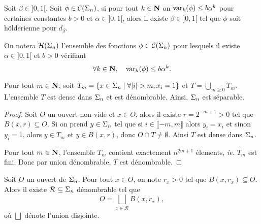   \begin{proposition}
    \label{prop:equiv_holder}
    Soit $\beta \in ]0, 1[$.
    Soit $\phi \in \mathcal{C} (\Sigma_{n})$, si pour tout $k \in \mathbf N$ on $\operatorname{var}_k(\phi) \leq b\alpha^k$ pour certaines constantes $b > 0$ et $\alpha \in ]0, 1[$,
    alors il existe $\beta \in ]0, 1[$ tel que $\phi$ soit hölderienne pour $d_{\beta}$.
  \end{proposition}

  \begin{definition}
    \label{def:holder_fn_set}
    On notera $\mathcal{H} (\Sigma_{n})$ l'ensemble des fonctions $\phi \in \mathcal{C} (\Sigma_{n})$ pour lesquels il existe $\alpha \in ]0, 1[$ et $b > 0$ vérifiant
    $$\forall k \in \mathbf N, \hspace{1em} \operatorname{var}_k(\phi) \leq b\alpha^k.$$
  \end{definition}


  \begin{proposition}
    \label{prop:separable}
    Pour tout $m \in \mathbf N$, soit $T_m = \left\{x \in \s_n \mid \forall|i|>m, x_i=1\right\}$ et $T = \bigcup_{m\geq 0}{T_m}$.
    L'ensemble $T$ est dense dans $\Sigma_n$ et est dénombrable. Ainsi, $\Sigma_n$ est séparable.
  \end{proposition}

  \begin{proof}
    Soit $O$ un ouvert non vide et $x \in O$, alors il existe $r = 2^{-m+1} > 0$ tel que $B(x, r) \subseteq O$.
    Si on prend $y \in \Sigma_n$ tel que si $i \in \llbracket -m, m \rrbracket$ alors $y_i = x_i$ et sinon $y_i = 1$,
    alors $y \in T_m$ et $y \in B(x, r)$, donc $O \cap T \not= \emptyset$. Ainsi $T$ est dense dans $\Sigma_n$.

    Pour tout $m \in \mathbf N$, l'ensemble $T_m$ contient exactement $n^{2m+1}$ élements, \textit{ie.} $T_m$ est fini.
    Donc par union dénombrable, $T$ est dénombrable.
  \end{proof}

  \begin{proposition}
    \label{prop:boules}
    Soit $O$ un ouvert de $\Sigma_n$. Pour tout $x \in O$, on note $r_x > 0$ tel que $B(x, r_x) \subseteq O$.
    Alors il existe $\mathcal R \subseteq \Sigma_n$ dénombrable tel que
    $$O = \bigsqcup_{x\in\mathcal R}{B(x, r_x)},$$
    où $\bigsqcup$ dénote l'union disjointe.
  \end{proposition}

